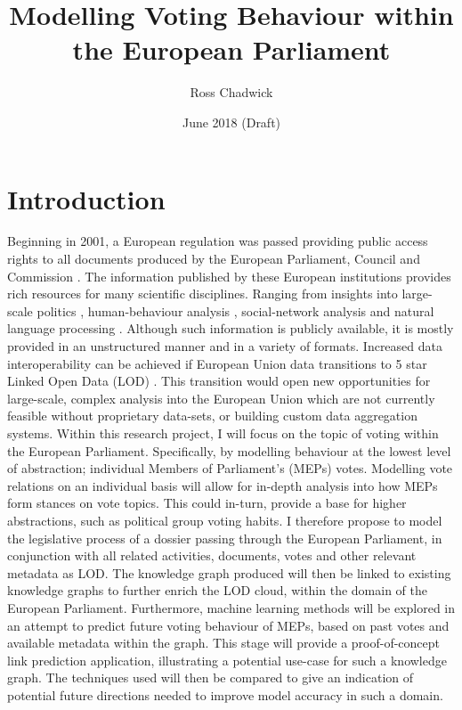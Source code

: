 \documentclass{article}
\title{Modelling Voting Behaviour within the European Parliament}
\author[1]{ Ross Chadwick }
\affil[1]{(Department of Computer Science, Vrije Universiteit Amsterdam)}
\date{June 2018 (Draft)}
\begin{document}
\maketitle

\section{Introduction}
Beginning in 2001, a European regulation was passed providing public access rights to all documents produced by the European Parliament, Council and Commission \cite{EURegulation2001}.
The information published by these European institutions provides rich resources for many scientific disciplines. Ranging from insights into large-scale politics \cite{Hoyland2014PredictingPA, Greene2015UnveilingTP, Hix2009VotingPA}, human-behaviour analysis \cite{Meserve2007PoliticalAA}, social-network analysis \cite{Cherepnalkoski2016RetweetNO, Cherepnalkoski2016CohesionAC, Cherepnalkoski2015ARN, NetworksAttila} and natural language processing \cite{Koehn2005EuroparlAP, Hajlaoui2014DCEPC}.
\newline
Although such information is publicly available, it is mostly provided in an unstructured manner and in a variety of formats. Increased data interoperability can be achieved if European Union data transitions to 5 star Linked Open Data (LOD) \cite{opendataRanking}. This transition would open new opportunities for large-scale, complex analysis into the European Union which are not currently feasible without proprietary data-sets, or building custom data aggregation systems.
\newline
Within this research project, I will focus on the topic of voting within the European Parliament. Specifically, by modelling behaviour at the lowest level of abstraction; individual Members of Parliament's (MEPs) votes. Modelling vote relations on an individual basis will allow for in-depth analysis into how MEPs form stances on vote topics. This could in-turn, provide a base for higher abstractions, such as political group voting habits.
\newline
I therefore propose to model the legislative process of a dossier passing through the European Parliament, in conjunction with all related activities, documents, votes and other relevant metadata as LOD.
The knowledge graph produced will then be linked to existing knowledge graphs to further enrich the LOD cloud, within the domain of the European Parliament.
\newline
Furthermore, machine learning methods will be explored in an attempt to predict future voting behaviour of MEPs, based on past votes and available metadata within the graph. This stage will provide a proof-of-concept link prediction application, illustrating a potential use-case for such a knowledge graph. The techniques used will then be compared to give an indication of potential future directions needed to improve model accuracy in such a domain.
\end{document}
